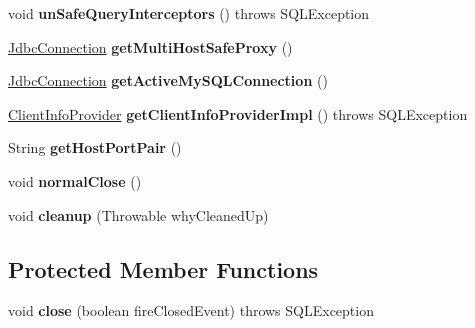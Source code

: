 \begin{DoxyCompactItemize}
$$void {\bfseries un\+Safe\+Query\+Interceptors} ()  throws S\+Q\+L\+Exception 
\item 
\mbox{\label{classcom_1_1mysql_1_1cj_1_1jdbc_1_1_connection_wrapper_a8418604a5879f2fd4e820fe438ff0c5a}} 
\mbox{\hyperlink{interfacecom_1_1mysql_1_1cj_1_1jdbc_1_1_jdbc_connection}{Jdbc\+Connection}} {\bfseries get\+Multi\+Host\+Safe\+Proxy} ()
\item 
\mbox{\label{classcom_1_1mysql_1_1cj_1_1jdbc_1_1_connection_wrapper_acc869cfc6c1bc921c9c1d46b4cd261b4}} 
\mbox{\hyperlink{interfacecom_1_1mysql_1_1cj_1_1jdbc_1_1_jdbc_connection}{Jdbc\+Connection}} {\bfseries get\+Active\+My\+S\+Q\+L\+Connection} ()
\item 
\mbox{\label{classcom_1_1mysql_1_1cj_1_1jdbc_1_1_connection_wrapper_ade0b119a9d79e5bf3433ad6e843b9f0a}} 
\mbox{\hyperlink{interfacecom_1_1mysql_1_1cj_1_1jdbc_1_1_client_info_provider}{Client\+Info\+Provider}} {\bfseries get\+Client\+Info\+Provider\+Impl} ()  throws S\+Q\+L\+Exception 
\item 
\mbox{\label{classcom_1_1mysql_1_1cj_1_1jdbc_1_1_connection_wrapper_a02892a193f92d8dcb540752cadd07a49}} 
String {\bfseries get\+Host\+Port\+Pair} ()
\item 
\mbox{\label{classcom_1_1mysql_1_1cj_1_1jdbc_1_1_connection_wrapper_a7fdf5a3f3e8efeaefc0a51ed69309416}} 
void {\bfseries normal\+Close} ()
\item 
\mbox{\label{classcom_1_1mysql_1_1cj_1_1jdbc_1_1_connection_wrapper_ab604be7f74e54251056bc902359fa65a}} 
void {\bfseries cleanup} (Throwable why\+Cleaned\+Up)
\end{DoxyCompactItemize}
\subsection*{Protected Member Functions}
\begin{DoxyCompactItemize}
\item 
\mbox{\label{classcom_1_1mysql_1_1cj_1_1jdbc_1_1_connection_wrapper_af395860424c66b64537c7557ebdfd6f0}} 
void {\bfseries close} (boolean fire\+Closed\+Event)  throws S\+Q\+L\+Exception 
\end{DoxyCompactItemize}
